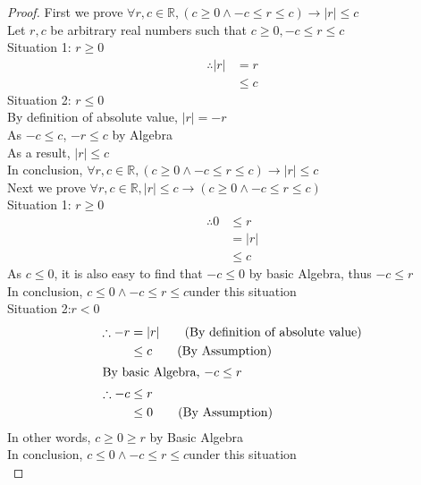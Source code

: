 \documentclass{article}
\begin{document}
\begin{proof}
First we prove $\forall r,c \in \mathbb{R}, (c \geq 0 \wedge -c \leq r \leq c) \rightarrow |r| \leq c$\\
Let $r,c$ be arbitrary real numbers such that $c \geq 0, -c \leq r \leq c$\\
Situation 1: $r \geq 0$\\
\begin{align*}
    \therefore
    |r| &= r \tag{By definition of absolute value}\\
    &\leq c  \tag{By assumption}
\end{align*}
Situation 2: $r \leq 0$\\
By definition of absolute value,
$|r| = -r$\\
As $-c \leq c$, $-r \leq c$ by Algebra\\
As a result, $|r| \leq c$\\
In conclusion, $\forall r,c \in \mathbb{R}, (c \geq 0 \wedge -c \leq r \leq c) \rightarrow |r| \leq c$\\

Next we prove $\forall r,c \in \mathbb{R}, |r| \leq c \rightarrow (c \geq 0 \wedge -c \leq r \leq c) $\\
Situation 1: $r \geq 0$\\
\begin{align*}
    \therefore 
    0 &\leq r \tag{By assumption}\\ 
    &= |r| \tag{By definition of absolute value}\\
    &\leq c \tag{By assumption}
\end{align*}
As $c \leq 0$, it is also easy to find that $-c \leq 0$ by basic Algebra, thus $-c \leq r$\\
In conclusion, $c \leq 0 \wedge -c \leq r \leq c $under this situation\\

Situation 2:$r < 0$\\
\begin{align*}
    \therefore
    -r &= |r| \tag{By definition of absolute value}\\
    &\leq c\tag{By Assumption}\\
    \intertext{By basic Algebra, $-c \leq r$}
    \therefore
    -c & \leq r\\
    & \leq 0 \tag{By Assumption}\\
\end{align*}
In other words, $c \geq 0 \geq r$ by Basic Algebra\\
In conclusion, $c \leq 0 \wedge -c \leq r \leq c $under this situation\\
\end{proof}
\end{document}

